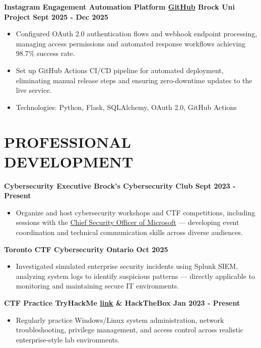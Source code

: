 \documentclass[11pt]{article}
\begin{document}
\textbf{Instagram Engagement Automation Platform \href{https://github.com/jeff13in/Instagram-Comment-to-Get-Automation}{GitHub} \textbar{} Brock Uni Project \textbar{} Sept 2025 - Dec 2025}
\begin{itemize}[leftmargin=1.5em, topsep=0pt, itemsep=0pt, parsep=0pt]
\item    Configured OAuth 2.0 authentication flows and webhook endpoint processing, managing access permissions and automated response workflows achieving 98.7\% success rate.
\item    Set up GitHub Actions CI/CD pipeline for automated deployment, eliminating manual release steps and ensuring zero-downtime updates to the live service.
\item    Technologies: Python, Flask, SQLAlchemy, OAuth 2.0, GitHub Actions
\end{itemize}

\section*{PROFESSIONAL DEVELOPMENT}
\textbf{Cybersecurity Executive \textbar{} Brock's Cybersecurity Club \textbar{} Sept 2023 - Present}
\begin{itemize}[leftmargin=1.5em, topsep=0pt,itemsep=0pt, parsep=0pt]
\item    Organize and host cybersecurity workshops and CTF competitions, including sessions with the \href{https://experiencebu.brocku.ca/event/260543}{Chief Security Officer of Microsoft} --- developing event coordination and technical communication skills across diverse audiences.

\end{itemize}
\textbf{Toronto CTF \textbar{} Cybersecurity Ontario \textbar{} Oct 2025}
\begin{itemize}[leftmargin=1.5em, topsep=0pt,itemsep=0pt, parsep=0pt]
\item    Investigated simulated enterprise security incidents using Splunk SIEM, analyzing system logs to identify suspicious patterns --- directly applicable to monitoring and maintaining secure IT environments.

\end{itemize}
\textbf{CTF Practice \textbar{} TryHackMe \href{https://tryhackme.com/p/Jeffin14}{link} \& HackTheBox \textbar{} Jan 2023 - Present}
\begin{itemize}[leftmargin=1.5em, topsep=0pt,itemsep=0pt, parsep=0pt]
\item    Regularly practice Windows/Linux system administration, network troubleshooting, privilege management, and access control across realistic enterprise-style lab environments.

\end{itemize}
\end{document}
